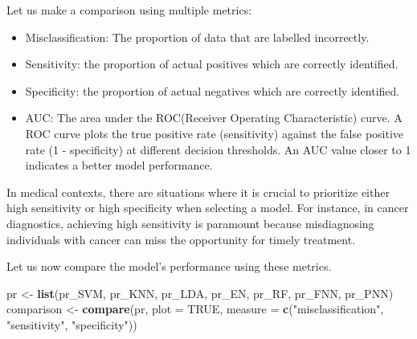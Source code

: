 \documentclass[
]{article}
\newenvironment{Shaded}{\begin{snugshade}}{\end{snugshade}}
\newcommand{\AttributeTok}[1]{\textcolor[rgb]{0.13,0.29,0.53}{#1}}
\newcommand{\ConstantTok}[1]{\textcolor[rgb]{0.56,0.35,0.01}{#1}}
\newcommand{\FunctionTok}[1]{\textcolor[rgb]{0.13,0.29,0.53}{\textbf{#1}}}
\newcommand{\NormalTok}[1]{#1}
\newcommand{\OtherTok}[1]{\textcolor[rgb]{0.56,0.35,0.01}{#1}}
\newcommand{\StringTok}[1]{\textcolor[rgb]{0.31,0.60,0.02}{#1}}
\begin{document}
Let us make a comparison using multiple metrics:

\begin{itemize}
\item
  Misclassification: The proportion of data that are labelled
  incorrectly.
\item
  Sensitivity: the proportion of actual positives which are correctly
  identified.
\item
  Specificity: the proportion of actual negatives which are correctly
  identified.
\item
  AUC: The area under the ROC(Receiver Operating Characteristic) curve.
  A ROC curve plots the true positive rate (sensitivity) against the
  false positive rate (1 - specificity) at different decision
  thresholds. An AUC value closer to 1 indicates a better model
  performance.
\end{itemize}

In medical contexts, there are situations where it is crucial to
prioritize either high sensitivity or high specificity when selecting a
model. For instance, in cancer diagnostics, achieving high sensitivity
is paramount because misdiagnosing individuals with cancer can miss the
opportunity for timely treatment.

Let us now compare the model's performance using these metrics.

\begin{Shaded}
\begin{Highlighting}[]
\NormalTok{pr }\OtherTok{\textless{}{-}} \FunctionTok{list}\NormalTok{(pr\_SVM, pr\_KNN, pr\_LDA, pr\_EN, pr\_RF, pr\_FNN, pr\_PNN)}
\NormalTok{comparison }\OtherTok{\textless{}{-}} \FunctionTok{compare}\NormalTok{(pr, }\AttributeTok{plot =} \ConstantTok{TRUE}\NormalTok{, }\AttributeTok{measure =} \FunctionTok{c}\NormalTok{(}\StringTok{"misclassification"}\NormalTok{, }\StringTok{"sensitivity"}\NormalTok{, }\StringTok{"specificity"}\NormalTok{))}
\end{Highlighting}
\end{Shaded}
\end{document}
